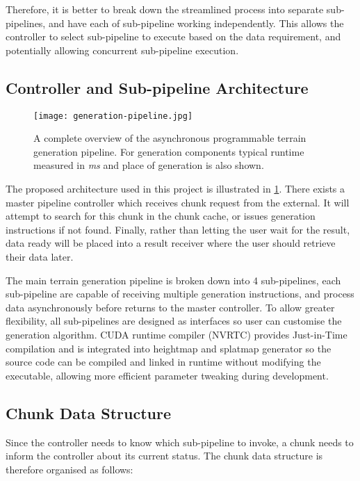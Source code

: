 \documentclass[oneside, a4paper]{report}
\begin{document}
    Therefore, it is better to break down the streamlined process into separate sub-pipelines, and have each of sub-pipeline working independently. This allows the controller to select sub-pipeline to execute based on the data requirement, and potentially allowing concurrent sub-pipeline execution.

    \subsection{Controller and Sub-pipeline Architecture}

    \begin{figure}[H]
        \texttt{[image: generation-pipeline.jpg]}
        \caption{A complete overview of the asynchronous programmable terrain generation pipeline. For generation components typical runtime measured in \textit{ms} and place of generation is also shown.}
        \label{generation_pipeline}
    \end{figure}

    The proposed architecture used in this project is illustrated in \ref{generation_pipeline}. There exists a master pipeline controller which receives chunk request from the external. It will attempt to search for this chunk in the chunk cache, or issues generation instructions if not found. Finally, rather than letting the user wait for the result, data ready will be placed into a result receiver where the user should retrieve their data later.

    The main terrain generation pipeline is broken down into 4 sub-pipelines, each sub-pipeline are capable of receiving multiple generation instructions, and process data asynchronously before returns to the master controller. To allow greater flexibility, all sub-pipelines are designed as interfaces so user can customise the generation algorithm. CUDA runtime compiler (NVRTC) provides Just-in-Time compilation and is integrated into heightmap and splatmap generator so the source code can be compiled and linked in runtime without modifying the executable, allowing more efficient parameter tweaking during development.

    \subsection{Chunk Data Structure}

    Since the controller needs to know which sub-pipeline to invoke, a chunk needs to inform the controller about its current status. The chunk data structure is therefore organised as follows:
\end{document}
